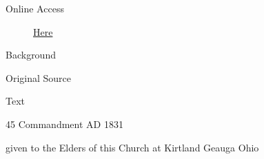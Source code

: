 			\begin{description}
				\item[Online Access] \href{https://www.josephsmithpapers.org/paper-summary/revelation-february-1831-a-dc-43/1}{Here}
			\end{description}
			
			\begin{description}
				\item[Background]
			\end{description}
			
			
			\begin{description}
				\item[Original Source]
			\end{description}
			
			
			\begin{description}
				\item[Text]
			\end{description}
			
				\begin{tightcenter}
				45 Commandment AD 1831
				\end{tightcenter}
				
				given to the Elders of this Church at Kirtland Geauga Ohio
				
